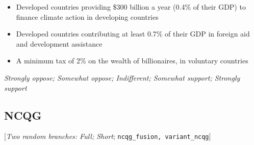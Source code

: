 \begin{enumerate}[resume]
\begin{itemize}
    \item Developed countries providing \$300 billion a year (0.4\% of their GDP) to finance climate action in developing countries
    \item Developed countries contributing at least 0.7\% of their GDP in foreign aid and development assistance
    \item A minimum tax of 2\% on the wealth of billionaires, in voluntary countries
\end{itemize}
\textit{Strongly oppose; Somewhat oppose; Indifferent; Somewhat support; Strongly support}
\end{enumerate} 

 \subsection*{NCQG} 
 [\textit{Two random branches: Full; Short}; %
 \verb|ncqg_fusion, variant_ncqg|] 
